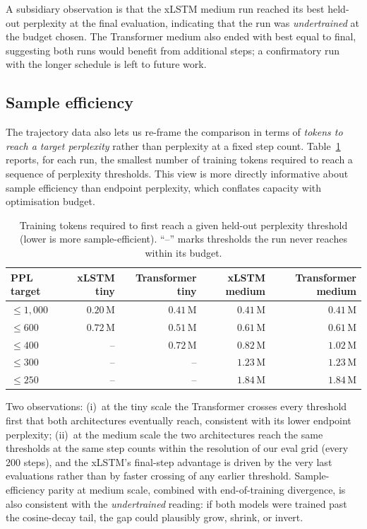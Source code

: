 \documentclass[11pt]{article}
\begin{document}
A subsidiary observation is that the xLSTM medium run reached its best
held-out perplexity at the final evaluation, indicating that the run was
\emph{undertrained} at the budget chosen. The Transformer medium also
ended with best equal to final, suggesting both runs would benefit from
additional steps; a confirmatory run with the longer schedule is left
to future work.

\subsection{Sample efficiency}\label{sec:sample-efficiency}

The trajectory data also lets us re-frame the comparison in terms of
\emph{tokens to reach a target perplexity} rather than perplexity at a
fixed step count. Table~\ref{tab:tokens-to-ppl} reports, for each run,
the smallest number of training tokens required to reach a sequence of
perplexity thresholds. This view is more directly informative about
sample efficiency than endpoint perplexity, which conflates capacity
with optimisation budget.

\begin{table}[h]
\centering
\caption{Training tokens required to first reach a given held-out
  perplexity threshold (lower is more sample-efficient). ``--'' marks
  thresholds the run never reaches within its budget.}
\label{tab:tokens-to-ppl}
\small
\setlength{\tabcolsep}{6pt}
\begin{tabular}{lrrrr}
\toprule
PPL target & xLSTM tiny & Transformer tiny & xLSTM medium & Transformer medium \\
\midrule
$\le 1{,}000$ & $0.20$\,M & $0.41$\,M & $0.41$\,M & $0.41$\,M \\
$\le 600$     & $0.72$\,M & $0.51$\,M & $0.61$\,M & $0.61$\,M \\
$\le 400$     & --        & $0.72$\,M & $0.82$\,M & $1.02$\,M \\
$\le 300$     & --        & --        & $1.23$\,M & $1.23$\,M \\
$\le 250$     & --        & --        & $1.84$\,M & $1.84$\,M \\
\bottomrule
\end{tabular}
\end{table}

Two observations: (i)~at the tiny scale the Transformer crosses every
threshold first that both architectures eventually reach, consistent
with its lower endpoint perplexity; (ii)~at the medium scale the two
architectures reach the same thresholds at the same step counts within
the resolution of our eval grid (every 200 steps), and the xLSTM's
final-step advantage is driven by the very last evaluations rather
than by faster crossing of any earlier threshold. Sample-efficiency
parity at medium scale, combined with end-of-training divergence, is
also consistent with the \emph{undertrained} reading: if both models
were trained past the cosine-decay tail, the gap could plausibly grow,
shrink, or invert.
\end{document}

